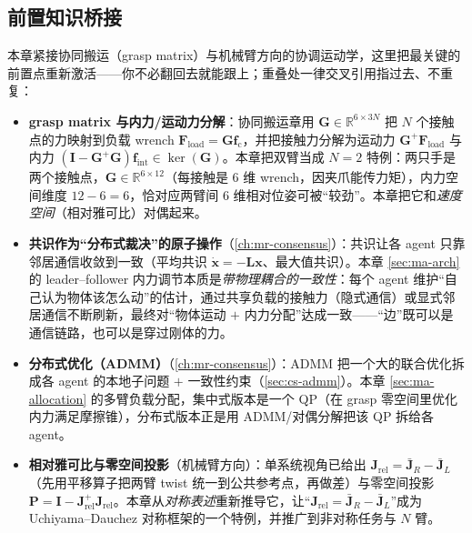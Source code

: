 \subsection*{前置知识桥接}
本章紧接协同搬运（grasp matrix）与机械臂方向的协调运动学，这里把最关键的前置点重新激活——你不必翻回去就能跟上；重叠处一律交叉引用指过去、不重复：
\begin{itemize}
  \item \textbf{grasp matrix 与内力/运动力分解}：协同搬运章用 $\mathbf{G}\in\mathbb{R}^{6\times 3N}$ 把 $N$ 个接触点的力映射到负载 wrench $\mathbf{F}_{\text{load}}=\mathbf{G}\mathbf{f}_{\text{c}}$，并把接触力分解为运动力 $\mathbf{G}^{+}\mathbf{F}_{\text{load}}$ 与内力 $(\mathbf{I}-\mathbf{G}^{+}\mathbf{G})\mathbf{f}_{\text{int}}\in\ker(\mathbf{G})$。本章把双臂当成 $N=2$ 特例：两只手是两个接触点，$\mathbf{G}\in\mathbb{R}^{6\times 12}$（每接触是 $6$ 维 wrench，因夹爪能传力矩），内力空间维度 $12-6=6$，恰对应两臂间 $6$ 维相对位姿可被“较劲”。本章把它和\emph{速度空间}（相对雅可比）对偶起来。
  \item \textbf{共识作为“分布式裁决”的原子操作}（\cref{ch:mr-consensus}）：共识让各 agent 只靠邻居通信收敛到一致（平均共识 $\dot{\mathbf{x}}=-\mathbf{L}\mathbf{x}$、最大值共识）。本章 \cref{sec:ma-arch} 的 leader--follower 内力调节本质是\emph{带物理耦合的一致性}：每个 agent 维护“自己认为物体该怎么动”的估计，通过共享负载的接触力（隐式通信）或显式邻居通信不断刷新，最终对“物体运动 $+$ 内力分配”达成一致——“边”既可以是通信链路，也可以是穿过刚体的力。
  \item \textbf{分布式优化（ADMM）}（\cref{ch:mr-consensus}）：ADMM 把一个大的联合优化拆成各 agent 的本地子问题 $+$ 一致性约束（\cref{sec:cs-admm}）。本章 \cref{sec:ma-allocation} 的多臂负载分配，集中式版本是一个 QP（在 grasp 零空间里优化内力满足摩擦锥），分布式版本正是用 ADMM/对偶分解把该 QP 拆给各 agent。
  \item \textbf{相对雅可比与零空间投影}（机械臂方向）：单系统视角已给出 $\mathbf{J}_{\text{rel}}=\bar{\mathbf{J}}_R-\bar{\mathbf{J}}_L$（先用平移算子把两臂 twist 统一到公共参考点，再做差）与零空间投影 $\mathbf{P}=\mathbf{I}-\mathbf{J}_{\text{rel}}^{+}\mathbf{J}_{\text{rel}}$。本章从\emph{对称表述}重新推导它，让“$\mathbf{J}_{\text{rel}}=\bar{\mathbf{J}}_R-\bar{\mathbf{J}}_L$”成为 Uchiyama--Dauchez 对称框架的一个特例，并推广到非对称任务与 $N$ 臂。
\end{itemize}

